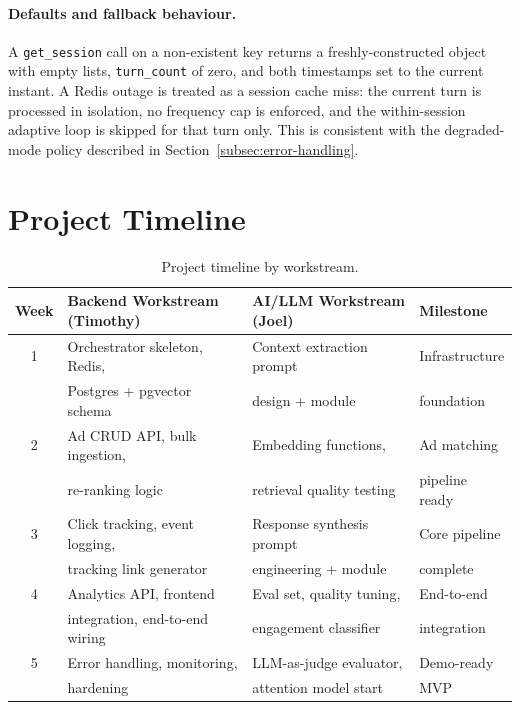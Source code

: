\begin{appendices}
\paragraph{Defaults and fallback behaviour.} A \texttt{get\_session}
call on a non-existent key returns a freshly-constructed object with
empty lists, \texttt{turn\_count} of zero, and both timestamps set to
the current instant. A Redis outage is treated as a session cache
miss: the current turn is processed in isolation, no frequency cap is
enforced, and the within-session adaptive loop is skipped for that
turn only. This is consistent with the degraded-mode policy described
in Section~\ref{subsec:error-handling}.

\section{Project Timeline}
\label{app:timeline}

\begin{table}[H]
    \centering
    \caption{Project timeline by workstream.}
    \label{tab:timeline}
    \begin{tabular}{@{}clll@{}}
        \toprule
        \textbf{Week} & \textbf{Backend Workstream (Timothy)}    & \textbf{AI/LLM Workstream (Joel)}    & \textbf{Milestone}    \\ \midrule
        1   & Orchestrator skeleton, Redis,      & Context extraction prompt      & Infrastructure        \\
            & Postgres + pgvector schema         & design + module                & foundation            \\[4pt]
        2   & Ad CRUD API, bulk ingestion,       & Embedding functions,           & Ad matching           \\
            & re-ranking logic                   & retrieval quality testing       & pipeline ready        \\[4pt]
        3   & Click tracking, event logging,     & Response synthesis prompt       & Core pipeline         \\
            & tracking link generator            & engineering + module           & complete              \\[4pt]
        4   & Analytics API, frontend            & Eval set, quality tuning,      & End-to-end            \\
            & integration, end-to-end wiring     & engagement classifier          & integration           \\[4pt]
        5   & Error handling, monitoring,        & LLM-as-judge evaluator,        & Demo-ready            \\
            & hardening                          & attention model start          & MVP                   \\
        \bottomrule
    \end{tabular}
\end{table}

\end{appendices}